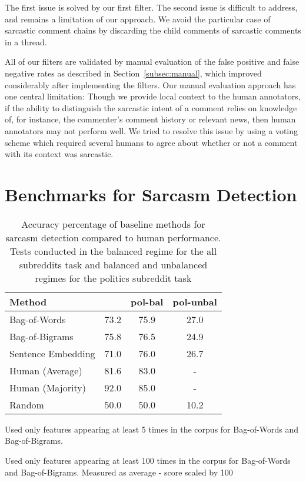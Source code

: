 \documentclass[10pt, a4paper]{article}
\begin{document}
\begin{itemize}
The first issue is solved by our first filter. The second issue is difficult to address, and remains a limitation of our approach. We avoid the particular case of sarcastic comment chains by discarding the child comments of sarcastic comments in a thread.

\end{itemize}

All of our filters are validated by manual evaluation of the false positive and false negative rates as described in Section~\ref{subsec:manual}, which improved considerably after implementing the filters. Our manual evaluation approach has one central limitation: Though we provide local context to the human annotators, if the ability to distinguish the sarcastic intent of a comment relies on knowledge of, for instance, the commenter's comment history or relevant news, then human annotators may not perform well. We tried to resolve this issue by using a voting scheme which required several humans to agree about whether or not a comment with its context was sarcastic. 


 


\section{Benchmarks for Sarcasm Detection}
\label{sec:detect}

\begin{table}[!t]
	\centering
	\begin{threeparttable}
		\begin{tabular}{@{}lccc@{}}
			Method &  & pol-bal & pol-unbal \\
			\toprule
			Bag-of-Words & 73.2 & 75.9 & 27.0\\
			Bag-of-Bigrams & 75.8 & 76.5 & 24.9\\
			Sentence Embedding & 71.0 & 76.0 & 26.7\\
			Human (Average) & 81.6 & 83.0 & -\\
			Human (Majority) & 92.0 & 85.0 & -\\
			Random & 50.0 & 50.0 & 10.2\\
			\bottomrule
		\end{tabular}
	\begin{tablenotes}
		\item[] Used only features appearing at least 5 times in the corpus for Bag-of-Words and Bag-of-Bigrams.
		\item[] Used only features appearing at least 100 times in the corpus for Bag-of-Words and Bag-of-Bigrams. Measured as average - score scaled by 100
	\end{tablenotes}
	\end{threeparttable}
		\caption{\label{tbl:performance}Accuracy percentage of baseline methods for sarcasm detection compared to human performance. Tests conducted in the balanced regime for the all subreddits task and balanced and unbalanced regimes for the politics subreddit task}
\end{table}
\end{document}
